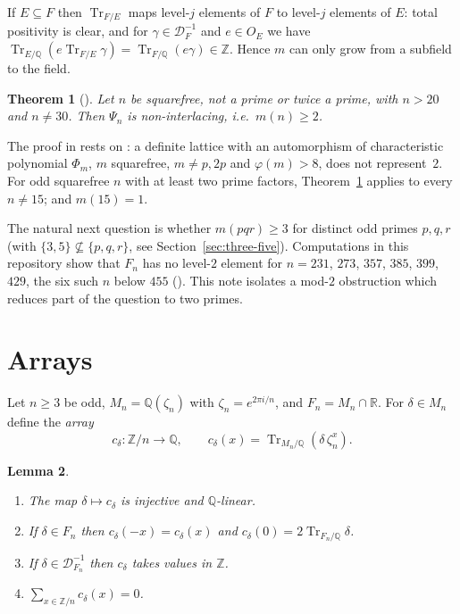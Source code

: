 \documentclass[11pt]{amsart}
\newcommand{\Q}{\mathbb{Q}}
\newcommand{\Z}{\mathbb{Z}}
\newcommand{\R}{\mathbb{R}}
\newcommand{\cod}[1]{\mathcal{D}_{#1}^{-1}}
\DeclareMathOperator{\Tr}{Tr}
\theoremstyle{plain}
\newtheorem{theorem}{Theorem}[section]
\newtheorem{lemma}[theorem]{Lemma}
\theoremstyle{definition}
\begin{document}
If $E \subseteq F$ then $\Tr_{F/E}$ maps level-$j$ elements of $F$ to level-$j$ elements of $E$:
total positivity is clear, and for $\gamma \in \cod{F}$ and $e \in O_E$ we have
$\Tr_{E/\Q}(e\Tr_{F/E}\gamma) = \Tr_{F/\Q}(e\gamma) \in \Z$. Hence $m$ can only grow from a
subfield to the field.

\begin{theorem}[{\cite[Thm.~1.2]{Y}}]\label{thm:yatsyna}
Let $n$ be squarefree, not a prime or twice a prime, with $n > 20$ and $n \neq 30$. Then
$\Psi_n$ is non-interlacing, i.e.\ $m(n) \geq 2$.
\end{theorem}

The proof in \cite{Y} rests on \cite[Cor.~2.2]{BF}: a definite lattice with an automorphism of
characteristic polynomial $\Phi_m$, $m$ squarefree, $m \neq p, 2p$ and $\varphi(m) > 8$, does
not represent~$2$. For odd squarefree $n$ with at least two prime factors,
Theorem~\ref{thm:yatsyna} applies to every $n \neq 15$; and $m(15) = 1$.

The natural next question is whether $m(pqr) \geq 3$ for distinct odd primes $p, q, r$ (with
$\{3,5\} \not\subseteq \{p,q,r\}$, see Section~\ref{sec:three-five}). Computations in this
repository show that $F_n$ has no level-$2$ element for $n = 231$, $273$, $357$, $385$, $399$,
$429$, the six such $n$ below $455$ ().
This note isolates a mod-$2$ obstruction which reduces part of the question to two primes.

\section{Arrays}\label{sec:arrays}

Let $n \geq 3$ be odd, $M_n = \Q(\zeta_n)$ with $\zeta_n = e^{2\pi i/n}$, and $F_n = M_n \cap \R$.
For $\delta \in M_n$ define the \emph{array}
\[
  c_\delta \colon \Z/n \to \Q, \qquad c_\delta(x) = \Tr_{M_n/\Q}(\delta\,\zeta_n^x).
\]

\begin{lemma}\label{lem:arrays}
\begin{enumerate}
\item The map $\delta \mapsto c_\delta$ is injective and $\Q$-linear.
\item If $\delta \in F_n$ then $c_\delta(-x) = c_\delta(x)$ and $c_\delta(0) = 2\Tr_{F_n/\Q}\delta$.
\item If $\delta \in \cod{F_n}$ then $c_\delta$ takes values in $\Z$.
\item $\sum_{x \in \Z/n} c_\delta(x) = 0$.
\end{enumerate}
\end{lemma}
\end{document}

